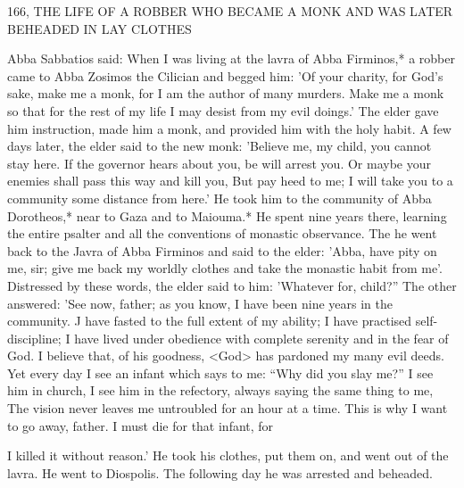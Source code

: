 166, THE LIFE OF A ROBBER WHO BECAME A MONK
AND WAS LATER BEHEADED IN LAY CLOTHES

Abba Sabbatios said: When I was living at the lavra of Abba
Firminos,* a robber came to Abba Zosimos the Cilician and begged
him: 'Of your charity, for God's sake, make me a monk, for I am
the author of many murders. Make me a monk so that for the rest
of my life I may desist from my evil doings.' The elder gave him
instruction, made him a monk, and provided him with the holy
habit. A few days later, the elder said to the new monk: 'Believe me,
my child, you cannot stay here. If the governor hears about you, be
will arrest you. Or maybe your enemies shall pass this way and kill
you, But pay heed to me; I will take you to a community some
distance from here.' He took him to the community of Abba
Dorotheos,* near to Gaza and to Maiouma.* He spent nine years
there, learning the entire psalter and all the conventions of monastic
observance. The he went back to the Javra of Abba Firminos and
said to the elder: 'Abba, have pity on me, sir; give me back my
worldly clothes and take the monastic habit from me'. Distressed by
these words, the elder said to him: 'Whatever for, child?” The other
answered: 'See now, father; as you know, I have been nine years in
the community. J have fasted to the full extent of my ability; I have
practised self-discipline; I have lived under obedience with complete
serenity and in the fear of God. I believe that, of his goodness,
<God> has pardoned my many evil deeds. Yet every day I see an
infant which says to me: “Why did you slay me?” I see him in
church, I see him in the refectory, always saying the same thing to
me, The vision never leaves me untroubled for an hour at a time.
This is why I want to go away, father. I must die for that infant, for

I killed it without reason.' He took his clothes, put them on, and
went out of the lavra. He went to Diospolis. The following day he
was arrested and beheaded.

